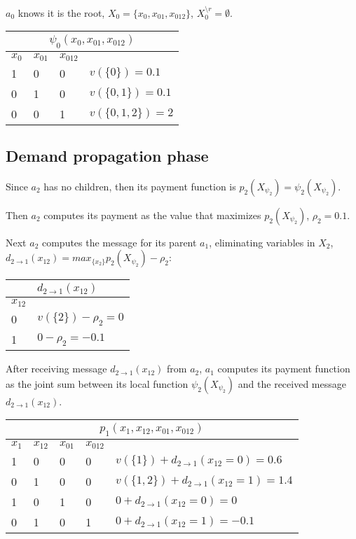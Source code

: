\documentclass{article}
\begin{document}
\noindent $a_0$ knows it is the root, $X_0=\{x_0,x_{01},x_{012}\}$,
$X^{\setminus r}_0=\emptyset$.


\noindent\begin{tabular}{ | l | l |  l | l | }
\multicolumn{4}{c}{$\psi_0(x_{0},x_{01},x_{012})$}  \\
\hline
	$x_{0}$ &	$x_{01}$ & $x_{012}$ &   \\
\hline
	1	 &		0	 &  0	&   $v(\{0\})= 0.1$  \\
	0	 &		1	 &	0 	&   $v(\{0,1\})=0.1$ \\
	0	 &		0	 &  1	&   $v(\{0,1,2\})=2$  \\
\hline
\end{tabular}

\subsection{Demand propagation phase}

\noindent Since $a_2$ has no children, then its payment function is
$p_2(X_{\psi_2})=\psi_2(X_{\psi_2})$.

\vspace{0.1in}\noindent Then $a_2$ computes its payment as the value that
maximizes $p_2(X_{\psi_2})$, $\rho_2 = 0.1$.

\vspace{0.1in}\noindent Next $a_2$ computes the message for its parent $a_1$,
eliminating variables in $X_2$, $d_{2\rightarrow 1}(x_{12}) = max_{\{x_2\}} p_2(X_{\psi_2})
-\rho_2$:


\noindent\begin{tabular}{ | l | l | }
\multicolumn{2}{c}{$d_{2\rightarrow 1}(x_{12})$}  \\
\hline
	$x_{12}$ &  \\
\hline
	0	 &	$v(\{2\})-\rho_2=0$  \\
	1	 &	$0 -\rho_2 = -0.1$ \\
\hline
\end{tabular}


\vspace{0.1in}\noindent After receiving message $d_{2\rightarrow 1}(x_{12})$
from $a_2$, $a_1$ computes its payment function as the joint sum between its local function
$\psi_2(X_{\psi_2})$ and the received message $d_{2\rightarrow 1}(x_{12})$.


\noindent\begin{tabular}{ | l | l |  l | l | l |}
\multicolumn{5}{c}{$p_1(x_{1},x_{12},x_{01},x_{012})$}  \\
\hline
	$x_{1}$ &	$x_{12}$ & $x_{01}$ & $x_{012}$ &  \\
\hline
	1	 &		0	 &  0	&  0 & $v(\{1\}) + d_{2\rightarrow 1}(x_{12}=0)= 0.6$  \\
	0	 &		1	 &	0 	&  0 & $v(\{1,2\})+ d_{2\rightarrow 1}(x_{12}=1)=1.4$ \\
	1	 &		0	 &  1	&  0 & $0+ d_{2\rightarrow 1}(x_{12}=0)=0$  \\
	0	 &		1	 &	0 	&  1 & $0+ d_{2\rightarrow 1}(x_{12}=1)=-0.1$ \\
\hline
\end{tabular}
\end{document}
